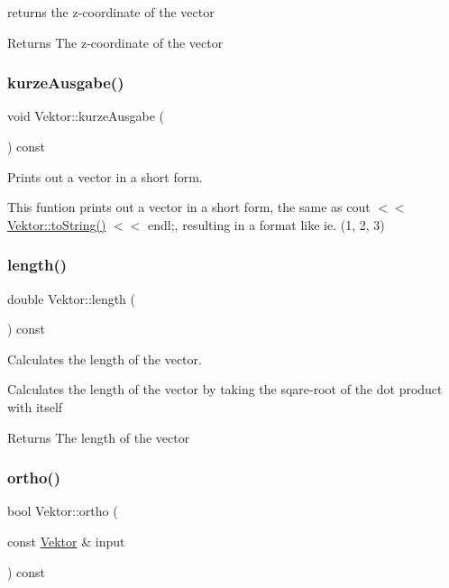 returns the z-\/coordinate of the vector 

\begin{DoxyReturn}{Returns}
The z-\/coordinate of the vector 
\end{DoxyReturn}
\mbox{\label{class_vektor_aa564a92eff73be949827eebef9806652}} 
\subsubsection{\texorpdfstring{kurze\+Ausgabe()}{kurzeAusgabe()}}
{\footnotesize\ttfamily void Vektor\+::kurze\+Ausgabe (\begin{DoxyParamCaption}{ }\end{DoxyParamCaption}) const}



Prints out a vector in a short form. 

This funtion prints out a vector in a short form, the same as cout $<$$<$ \hyperlink{class_vektor_abcc349a76c74b8464efaedddfec94a04}{Vektor\+::to\+String()} $<$$<$ endl;, resulting in a format like ie. (1, 2, 3) \mbox{\label{class_vektor_aa17fc7f816fc425482b17fdafc45a4ed}} 
\subsubsection{\texorpdfstring{length()}{length()}}
{\footnotesize\ttfamily double Vektor\+::length (\begin{DoxyParamCaption}{ }\end{DoxyParamCaption}) const}



Calculates the length of the vector. 

Calculates the length of the vector by taking the sqare-\/root of the dot product with itself

\begin{DoxyReturn}{Returns}
The length of the vector 
\end{DoxyReturn}
\mbox{\label{class_vektor_a4624deedf4290c110ff4cfb756184f39}} 
\subsubsection{\texorpdfstring{ortho()}{ortho()}}
{\footnotesize\ttfamily bool Vektor\+::ortho (\begin{DoxyParamCaption}\item[{const \hyperlink{class_vektor}{Vektor} \&}]{input }\end{DoxyParamCaption}) const}



